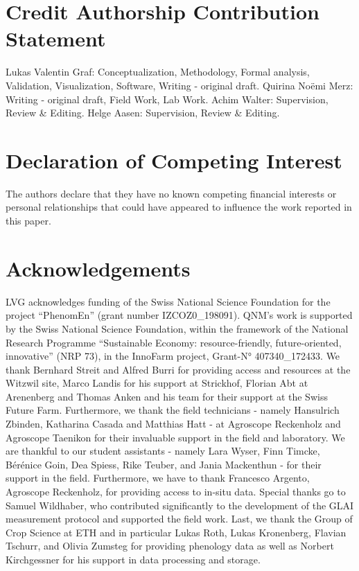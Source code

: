\section*{Credit Authorship Contribution Statement}
Lukas Valentin Graf: Conceptualization, Methodology, Formal analysis, Validation, Visualization, Software, Writing - original draft. Quirina Noëmi Merz: Writing - original draft, Field Work, Lab Work. Achim Walter: Supervision, Review \& Editing. Helge Aasen:  Supervision, Review \& Editing.

\section*{Declaration of Competing Interest}

The authors declare that they have no known competing financial interests or personal relationships that could have appeared to influence the work reported in this paper.

\section*{Acknowledgements}
LVG acknowledges funding of the Swiss National Science Foundation for the project “PhenomEn” (grant number IZCOZ0\_198091). QNM's work is supported by the Swiss National Science Foundation, within the framework of the National Research Programme “Sustainable Economy: resource-friendly, future-oriented, innovative” (NRP 73), in the InnoFarm project, Grant-N° 407340\_172433. We thank Bernhard Streit and Alfred Burri for providing access and resources at the Witzwil site, Marco Landis for his support at Strickhof, Florian Abt at Arenenberg and Thomas Anken and his team for their support at the Swiss Future Farm. Furthermore, we thank the field technicians - namely Hansulrich Zbinden, Katharina Casada and Matthias Hatt - at Agroscope Reckenholz and Agroscope Taenikon for their invaluable support in the field and laboratory. We are thankful to our student assistants - namely Lara Wyser, Finn Timcke, Bérénice Goin, Dea Spiess, Rike Teuber, and Jania Mackenthun - for their support in the field. Furthermore, we have to thank Francesco Argento, Agroscope Reckenholz, for providing access to in-situ data. Special thanks go to Samuel Wildhaber, who contributed significantly to the development of the GLAI measurement protocol and supported the field work. Last, we thank the Group of Crop Science at ETH and in particular Lukas Roth, Lukas Kronenberg, Flavian Tschurr, and Olivia Zumsteg for providing phenology data as well as Norbert Kirchgessner for his support in data processing and storage.